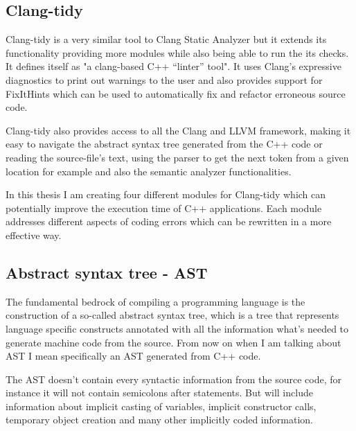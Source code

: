 \subsection{Clang-tidy}
\par Clang-tidy is a very similar tool to Clang Static Analyzer but it extends its functionality providing more modules while also being able to run the its checks. It defines itself as "a clang-based C++ “linter” tool"\cite{clang_tidy_mainpage}. It uses Clang's expressive diagnostics to print out warnings to the user and also provides support for FixItHints which can be used to automatically fix and refactor erroneous source code. \medskip
\par Clang-tidy also provides access to all the Clang and LLVM framework, making it easy to navigate the abstract syntax tree generated from the C++ code or reading the source-file's text, using the parser to get the next token from a given location for example and also the semantic analyzer functionalities.\medskip
\par In this thesis I am creating four different modules for Clang-tidy which can potentially improve the execution time of C++ applications. Each module addresses different aspects of coding errors which can be rewritten in a more effective way. 
\subsection{Abstract syntax tree - AST}
\par The fundamental bedrock of compiling a programming language is the construction of a so-called abstract syntax tree, which is a tree that represents language specific constructs annotated with all the information what's needed to generate machine code from the source. From now on when I am talking about AST I mean specifically an AST generated from C++ code. \medskip
\par The AST doesn't contain every syntactic information from the source code, for instance it will not contain semicolons after statements. But will include information about implicit casting of variables, implicit constructor calls, temporary object creation and many other implicitly coded information. 

